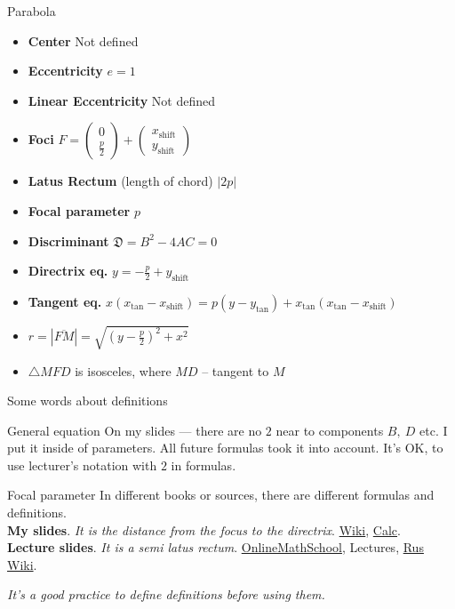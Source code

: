 \documentclass[aspectratio=169]{beamer}
\newcommand{\shf}{\text{shift}}
\begin{document}
\begin{frame}[t]{Parabola}
\begin{multicols}{3}
\begin{itemize}
            \item \textbf{Center} Not defined
            \item \textbf{Eccentricity} $e = 1$
            \item \textbf{Linear Eccentricity} Not defined
            \item \textbf{Foci} $F = \begin{pmatrix} 0\\\frac{p}{2} \end{pmatrix} + \begin{pmatrix} x_{\shf}\\y_{\shf} \end{pmatrix}$
            \item \textbf{Latus Rectum} (length of chord) $|2p|$
            \item \textbf{Focal parameter}  $p$
            \item \textbf{Discriminant} $\mathfrak{D} = B^2 - 4AC = 0$
            \item \textbf{Directrix eq.} $y = -\frac{p}{2} + y_{\shf}$
            \item \textbf{Tangent eq.}  $x(x_{\text{tan}}-x_{\shf})=p(y-y_{\text{tan}})+x_{\text{tan}}(x_{\text{tan}}-x_{\shf})$
            \item $r = |\overline{FM}|=\sqrt{(y-\frac{p}{2})^2+x^2}$
            \item $\triangle MFD$ is isosceles, where $MD$ -- tangent to $M$
            \end{itemize}
    \end{multicols}
    \end{frame}

\begin{frame}[t]{Some words about definitions}
    \begin{exampleblock}{General equation}
        On my slides --- there are no $2$ near to components $B,\ D$ etc. I put it inside of parameters. All future formulas took it into account. It's OK, to use lecturer's notation with $2$ in formulas.
    \end{exampleblock}
    \begin{alertblock}{Focal parameter}
        In different books or sources, there are different formulas and definitions.\\
        \textbf{My slides}. \textit{It is the distance from the focus to the directrix}. \href{https://en.wikipedia.org/wiki/Conic_section}{Wiki}, \href{https://www.calculatoratoz.com/en/focal-parameter-of-ellipse-calculator/Calc-836}{Calc}.\\
        \textbf{Lecture slides}. \textit{It is a semi latus rectum}. \href{https://onlinemschool.com/math/formula/ellipse/}{OnlineMathSchool}, Lectures, \href{https://ru.wikipedia.org/wiki/Эллипс}{Rus Wiki}.
    \end{alertblock}
    \medskip

    \centering\textit{ It's a good practice to define definitions before using them.}
\end{frame}
\end{document}
